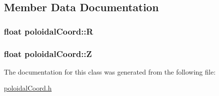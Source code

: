 \subsection{Member Data Documentation}
\hypertarget{classpoloidalCoord_aabe27b2d24f9219eb3a742356a308c83}{
\subsubsection[{R}]{\setlength{\rightskip}{0pt plus 5cm}float {\bf poloidalCoord::R}}}
\label{classpoloidalCoord_aabe27b2d24f9219eb3a742356a308c83}
\hypertarget{classpoloidalCoord_aaf36de74eb60396dc9839b0d1b56abf3}{
\subsubsection[{Z}]{\setlength{\rightskip}{0pt plus 5cm}float {\bf poloidalCoord::Z}}}
\label{classpoloidalCoord_aaf36de74eb60396dc9839b0d1b56abf3}


The documentation for this class was generated from the following file:\begin{DoxyCompactItemize}
\item 
\hyperlink{poloidalCoord_8h}{poloidalCoord.h}\end{DoxyCompactItemize}
